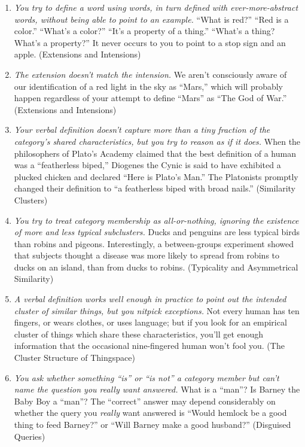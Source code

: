 {{\begin{enumerate}
\item {
 \textit{You try to define a word using words, in turn defined with
ever-more-abstract words, without being able to point to an example.}
``What is red?''
``Red is a color.''
``What's a color?''
``It's a property of a
thing.'' ``What's a
thing? What's a property?'' It never
occurs to you to point to a stop sign and an apple. (Extensions and
Intensions)}

\item {
 \textit{The extension doesn't match the
intension.} We aren't consciously aware of our
identification of a red light in the sky as
``Mars,'' which will probably happen
regardless of your attempt to define
``Mars'' as ``The
God of War.'' (Extensions and Intensions)}

\item {
 \textit{Your verbal definition doesn't capture
more than a tiny fraction of the category's shared
characteristics, but you try to reason as if it does.} When the
philosophers of Plato's Academy claimed that the best
definition of a human was a ``featherless
biped,'' Diogenes the Cynic is said to have exhibited
a plucked chicken and declared ``Here is
Plato's Man.'' The Platonists
promptly changed their definition to ``a featherless
biped with broad nails.'' (Similarity Clusters)}

\item {
 \textit{You try to treat category membership as all-or-nothing,
ignoring the existence of more and less typical subclusters.} Ducks and
penguins are less typical birds than robins and pigeons. Interestingly,
a between-groups experiment showed that subjects thought a disease was
more likely to spread from robins to ducks on an island, than from
ducks to robins. (Typicality and Asymmetrical Similarity)}

\item {
 \textit{A verbal definition works well enough in practice to point
out the intended cluster of similar things, but you nitpick
exceptions.} Not every human has ten fingers, or wears clothes, or uses
language; but if you look for an empirical cluster of things which
share these characteristics, you'll get enough
information that the occasional nine-fingered human
won't fool you. (The Cluster Structure of Thingspace)}

\item {
 \textit{You ask whether something
``is'' or ``is
not'' a category member but can't
name the question you really want answered.} What is a
``man''? Is Barney the Baby Boy a
``man''? The
``correct'' answer may depend
considerably on whether the query you \textit{really} want answered is
``Would hemlock be a good thing to feed
Barney?'' or ``Will Barney make a
good husband?'' (Disguised Queries)}


\end{enumerate}}}
